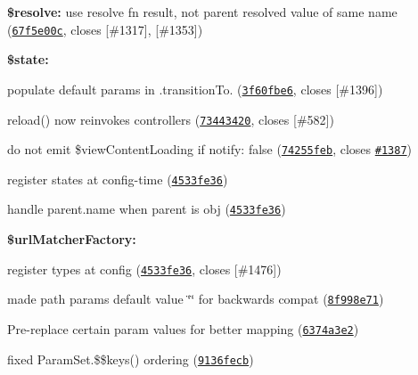 {\bfseries {\bfseries {\bfseries {\bfseries 
\begin{DoxyItemize}
\item {\bfseries \$resolve\+:} use resolve fn result, not parent resolved value of same name (\href{https://github.com/angular-ui/ui-router/commit/67f5e00cc9aa006ce3fe6cde9dff261c28eab70a}{\tt 67f5e00c}, closes \mbox{[}\#1317\mbox{]}, \mbox{[}\#1353\mbox{]})
\item {\bfseries \$state\+:}
\begin{DoxyItemize}
\item populate default params in .transition\+To. (\href{https://github.com/angular-ui/ui-router/commit/3f60fbe6d65ebeca8d97952c05aa1d269f1b7ba1}{\tt 3f60fbe6}, closes \mbox{[}\#1396\mbox{]})
\item reload() now reinvokes controllers (\href{https://github.com/angular-ui/ui-router/commit/7344342018847902594dc1fc62d30a5c30f01763}{\tt 73443420}, closes \mbox{[}\#582\mbox{]})
\item do not emit \$view\+Content\+Loading if notify\+: false (\href{https://github.com/angular-ui/ui-router/commit/74255febdf48ae082a02ca1e735165f2c369a463}{\tt 74255feb}, closes \href{https://github.com/angular-ui/ui-router/issues/1387}{\tt \#1387})
\item register states at config-\/time (\href{https://github.com/angular-ui/ui-router/commit/4533fe36e0ab2f0143edd854a4145deaa013915a}{\tt 4533fe36})
\item handle parent.\+name when parent is obj (\href{https://github.com/angular-ui/ui-router/commit/4533fe36e0ab2f0143edd854a4145deaa013915a}{\tt 4533fe36})
\end{DoxyItemize}
\item {\bfseries \$url\+Matcher\+Factory\+:}
\begin{DoxyItemize}
\item register types at config (\href{https://github.com/angular-ui/ui-router/commit/4533fe36e0ab2f0143edd854a4145deaa013915a}{\tt 4533fe36}, closes \mbox{[}\#1476\mbox{]})
\item made path params default value \char`\"{}\char`\"{} for backwards compat (\href{https://github.com/angular-ui/ui-router/commit/8f998e71e43a0b31293331c981f5db0f0097b8ba}{\tt 8f998e71})
\item Pre-\/replace certain param values for better mapping (\href{https://github.com/angular-ui/ui-router/commit/6374a3e29ab932014a7c77d2e1ab884cc841a2e3}{\tt 6374a3e2})
\item fixed Param\+Set.\$\$keys() ordering (\href{https://github.com/angular-ui/ui-router/commit/9136fecbc2bfd4fda748a9914f0225a46c933860}{\tt 9136fecb})

\end{DoxyItemize}
\end{DoxyItemize}}}}}
